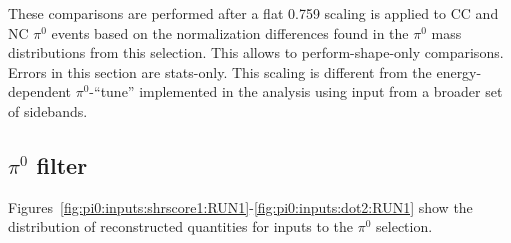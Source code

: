 \par These comparisons are performed after a flat 0.759 scaling is applied to CC and NC $\pi^0$ events based on the normalization differences found in the $\pi^0$ mass distributions from this selection. This allows to perform-shape-only comparisons. Errors in this section are stats-only. This scaling is different from the energy-dependent $\pi^0$-``tune'' implemented in the analysis using input from a broader set of sidebands.


\subsection{$\pi^0$ filter}
\label{app:pi0:input}
\par Figures~\ref{fig:pi0:inputs:shrscore1:RUN1}-\ref{fig:pi0:inputs:dot2:RUN1} show the distribution of reconstructed quantities for inputs to the $\pi^0$ selection. 
